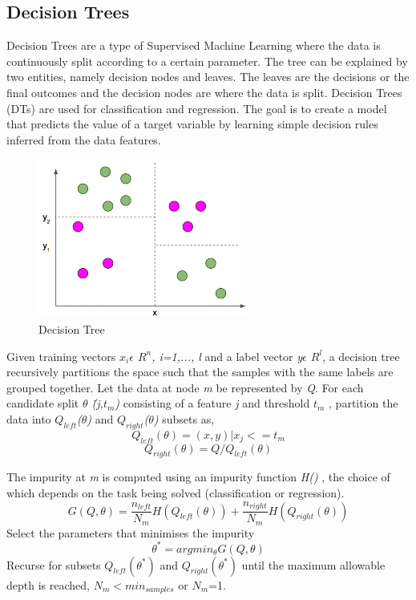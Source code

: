 \documentclass[a4paper, 10pt, conference]{IEEEtran}
\begin{document}
\subsection{Decision Trees}
Decision Trees are a type of Supervised Machine Learning where the data is continuously split according to a certain parameter. The tree can be explained by two entities, namely decision nodes and leaves. The leaves are the decisions or the final outcomes and the decision nodes are where the data is split.
Decision Trees (DTs) are used for classification and regression. The goal is to create a model that predicts the value of a target variable by learning simple decision rules inferred from the data features.
\begin{figure}
  \includegraphics[width=\linewidth]{dt.png}
  \caption{Decision Tree}
  \label{fig:dt}
\end{figure}

Given training vectors \textit{$x_{i}\epsilon$ $R^{n}$, i=1,..., l} and a label  vector \textit{y$\epsilon$ $R^{l}$}, a decision tree recursively partitions the space such that the samples with the same labels are grouped together.
Let the data at node \textit{m} be represented by \textit{Q}. For each candidate split \textit{$\theta$ \= (j,$t_{m}$)} consisting of a feature \textit{j} and threshold \textit{$t_{m}$} , partition the data into \textit{$Q_{left}$($\theta$)} and \textit{$Q_{right}$($\theta$)} subsets as,
\[ Q_{left}(\theta) = (x,y)|x_{j}<=t_{m}
\]
\[ Q_{right}(\theta) = Q/Q_{left}(\theta)
\]

The impurity at \textit{m} is computed using an impurity function \textit{H()} , the choice of which depends on the task being solved (classification or regression).
\[ G(Q,\theta) = \frac{n_{left}}{N_{m}}H(Q_{left}(\theta)) + \frac{n_{right}}{N_{m}}H(Q_{right}(\theta))
\]
Select the parameters that minimises the impurity
\[ \theta^{\ast} = arg min_{\theta}G(Q,\theta)
\]
Recurse for subsets \textit{$Q_{left}(\theta^{\ast})$} and \textit{$Q_{right}(\theta^{\ast})$} until the maximum allowable depth is reached, \textit{$N_{m}< min_{samples}$} or \textit{$N_{m}$}=1.
\\
\end{document}
